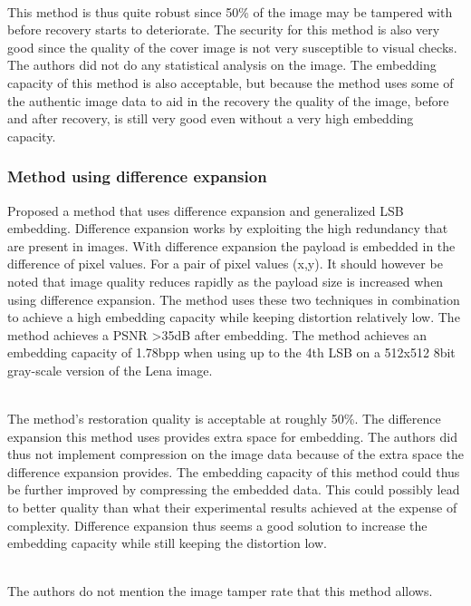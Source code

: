 \documentclass[11pt]{article}
\begin{document}
\hspace{0pt} \\
This method \cite {korus2013efficient} is thus quite robust since 50\% of the image may be tampered with before recovery starts to deteriorate.
The security for this method is also very good since the quality of the cover image is not very susceptible to visual checks.
The authors did not do any statistical analysis on the image.
The embedding capacity of this method is also acceptable, but because the method uses some of the authentic image data to aid in the recovery the quality of the image, before and after recovery, is still very good even without a very high embedding capacity.  

\subsubsection{Method using difference expansion}
\label{differenceExpansionOverview}
\cite {tian2003high} Proposed a method that uses difference expansion and generalized LSB embedding.
Difference expansion works by exploiting the high redundancy that are present in images.
With difference expansion the payload is embedded in the difference of pixel values. 
For a pair of pixel values (x,y). \cite {tian2002reversible}
It should however be noted that image quality reduces rapidly as the payload size is increased when using difference expansion. 
The method uses these two techniques in combination to achieve a high embedding capacity while keeping distortion relatively low.
The method achieves a PSNR \textgreater 35dB after embedding.
The method achieves an embedding capacity of 1.78bpp when using up to the 4th LSB on a 512x512 8bit gray-scale version of the Lena image.

\hspace{0pt} \\
The method's \cite {tian2003high} restoration quality is acceptable at roughly 50\%. 
The difference expansion this method uses provides extra space for embedding.
The authors did thus not implement compression on the image data because of the extra space the difference expansion provides.
The embedding capacity of this method could thus be further improved by compressing the embedded data. This could possibly lead to better quality than what their experimental results achieved at the expense of complexity.
Difference expansion thus seems a good solution to increase the embedding capacity while still keeping the distortion low.

\hspace{0pt} \\ 
The authors do not mention the image tamper rate that this method \cite {tian2003high} allows.
\end{document}
